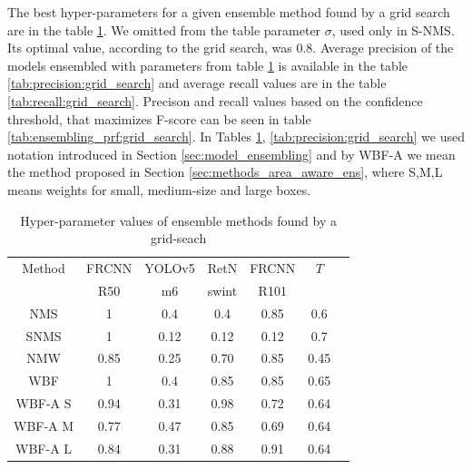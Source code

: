 The best hyper-parameters for a given ensemble method found by a grid search are in the table \ref{tab:ensemble_params:grid_search}. We omitted from the table parameter $\sigma$, used only in S-NMS. Its optimal value, according to the grid search, was $0.8$.
Average precision of the models ensembled with parameters from table \ref{tab:ensemble_params:grid_search} is available in the table \ref{tab:precision:grid_search} and average recall values are in the table \ref{tab:recall:grid_search}. Precison and recall values based on the confidence threshold, that maximizes F-score can be seen in table \ref{tab:ensembling_prf:grid_search}. In Tables \ref{tab:ensemble_params:grid_search}, \ref{tab:precision:grid_search} we used notation introduced in Section \ref{sec:model_ensembling} and by WBF-A we mean the method proposed in Section \ref{sec:methods_area_aware_ens}, where S,M,L means weights for small, medium-size and large boxes.

\begin{table}[H]
    \begin{tabular}{|c|c|c|c|c|c|c|}
        \hline
        Method  & FRCNN & YOLOv5 & RetN  & FRCNN & $T$  \\
                & R50   & m6     & swint & R101  &      \\ \hline
        NMS     & 1     & 0.4    & 0.4   & 0.85  & 0.6  \\ \hline
        SNMS    & 1     & 0.12   & 0.12  & 0.12  & 0.7  \\ \hline
        NMW     & 0.85  & 0.25   & 0.70  & 0.85  & 0.45 \\ \hline
        WBF     & 1     & 0.4    & 0.85  & 0.85  & 0.65 \\ \hline
        WBF-A S & 0.94  & 0.31   & 0.98  & 0.72  & 0.64 \\ \hline
        WBF-A M & 0.77  & 0.47   & 0.85  & 0.69  & 0.64 \\ \hline
        WBF-A L & 0.84  & 0.31   & 0.88  & 0.91  & 0.64 \\ \hline
    \end{tabular}
    \caption{Hyper-parameter values of ensemble methods found by a grid-seach}
    \label{tab:ensemble_params:grid_search}
\end{table}


